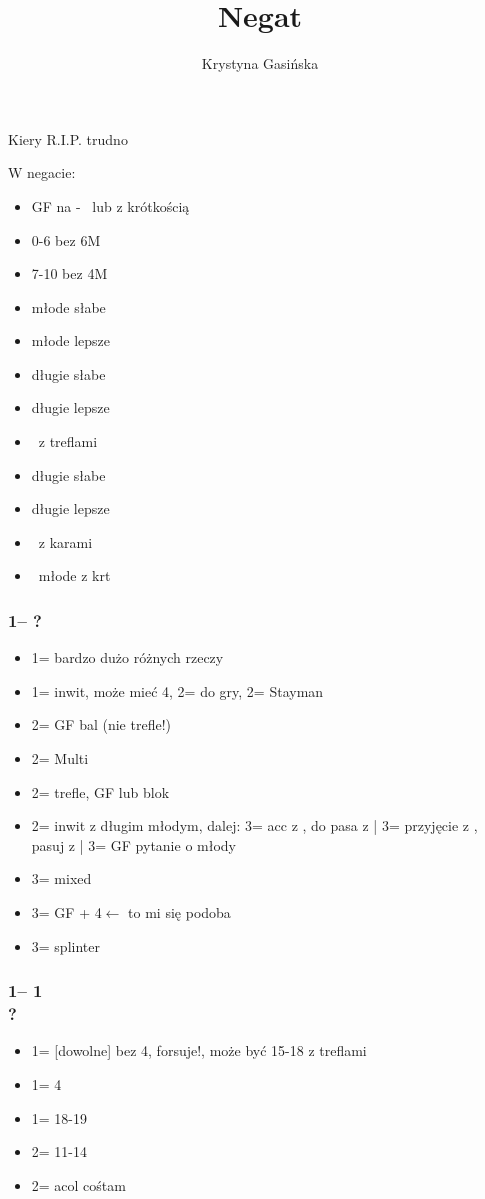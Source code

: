 \documentclass[12pt, a4paper]{article}
\title{Negat}
\author{Krystyna Gasińska}
\begin{document}
\maketitle

Kiery \hearts \small{R.I.P.} trudno

W negacie:
\begin{itemize}
    \item GF na \diams - \bal\ lub z krótkością
    \item 0-6 bez 6M
    \item 7-10 bez 4M
    \item młode słabe
    \item młode lepsze
    \item długie \clubs słabe
    \item długie \clubs lepsze
    \item \inv\ z treflami
    \item długie \diams słabe
    \item długie \diams lepsze
    \item \inv\ z karami
    \item \invp\ młode z krt
\end{itemize}

\subsubsection*{1\clubs -- ?}
\begin{itemize}
    \item 1\diams = bardzo dużo różnych rzeczy
    \item 1\nt = inwit, może mieć 4\major, 2\clubs = do gry, 2\diams = Stayman 
    \item 2\clubs = GF bal (nie trefle!) 
    \item 2\diams = Multi 
    \item 2\spades = trefle, GF lub blok 
    \item 2\nt = inwit z długim młodym, dalej: 3\clubs = acc z \diams, do pasa z \clubs | 3\diams = przyjęcie z \clubs, pasuj z \diams | 3\hearts = GF pytanie o młody 
    \item 3\clubs = mixed 
    \item 3\diams = GF \diams + 4\major $\leftarrow$ to mi się podoba 
    \item 3\major = splinter
\end{itemize}

\subsubsection*{1\clubs -- 1\diams \\
                ?}
\begin{itemize}
    \item 1\hearts = [dowolne] bez 4\spades, forsuje!, może być 15-18 z treflami
    \item 1\spades = 4\spades
    \item 1\nt = 18-19 \bal 
    \item 2\clubs = 11-14 \clubs 
    \item 2\diams = acol cośtam
\end{itemize}
\end{document}

